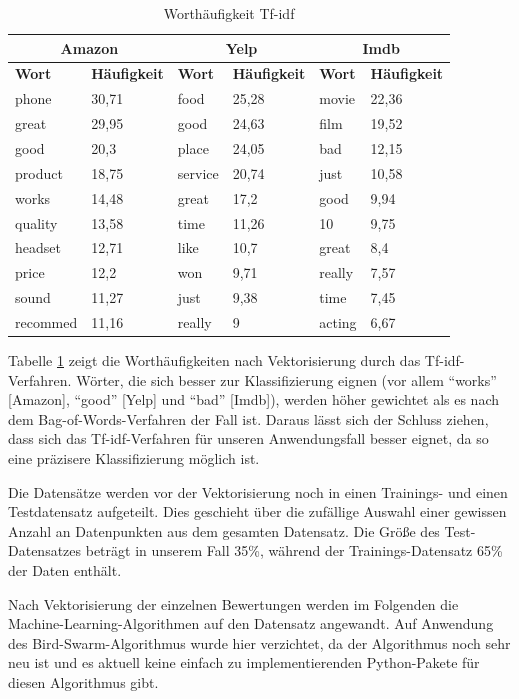 \documentclass[a4paper,12pt]{article}
\begin{document}
\begin{table}[h]
\centering
\begin{tabular}{|ll|ll|ll|}
\hline
\multicolumn{2}{|c|}{\textbf{Amazon}}&\multicolumn{2}{c}{\textbf{Yelp}}&\multicolumn{2}{|c|}{\textbf{Imdb}} \\
\hline
\textbf{Wort} & \textbf{Häufigkeit} & \textbf{Wort} & \textbf{Häufigkeit} &\textbf{Wort} & \textbf{Häufigkeit} \\
\hline
phone & 30,71 & food & 25,28 & movie & 22,36 \\
great & 29,95 & good & 24,63 & film & 19,52 \\
good & 20,3 & place & 24,05 & bad & 12,15 \\
product & 18,75 & service & 20,74 & just & 10,58 \\
works & 14,48 & great & 17,2 & good & 9,94 \\
quality & 13,58 & time & 11,26 & 10 & 9,75 \\
headset & 12,71 & like & 10,7 & great & 8,4 \\
price & 12,2 & won & 9,71 & really & 7,57 \\
sound & 11,27 & just & 9,38 & time & 7,45 \\
recommed & 11,16 & really & 9 & acting & 6,67 \\
\hline
\end{tabular}
\caption{Worthäufigkeit Tf-idf}
\label{Tfidf}
\end{table}

Tabelle \ref{Tfidf} zeigt die Worthäufigkeiten nach Vektorisierung durch das Tf-idf-Verfahren. Wörter, die sich besser zur Klassifizierung eignen (vor allem ``works'' [Amazon], ``good'' [Yelp] und ``bad'' [Imdb]), werden höher gewichtet als es nach dem Bag-of-Words-Verfahren der Fall ist. Daraus lässt sich der Schluss ziehen, dass sich das Tf-idf-Verfahren für unseren Anwendungsfall besser eignet, da so eine präzisere Klassifizierung möglich ist.

Die Datensätze werden vor der Vektorisierung noch in einen Trainings- und einen Testdatensatz aufgeteilt. Dies geschieht über die zufällige Auswahl einer gewissen Anzahl an Datenpunkten aus dem gesamten Datensatz. Die Größe des Test-Datensatzes beträgt in unserem Fall 35\%, während der Trainings-Datensatz 65\% der Daten enthält.

Nach Vektorisierung der einzelnen Bewertungen werden im Folgenden die Machine-Learning-Algorithmen auf den Datensatz angewandt. Auf Anwendung des Bird-Swarm-Algorithmus wurde hier verzichtet, da der Algorithmus noch sehr neu ist und es aktuell keine einfach zu implementierenden Python-Pakete für diesen Algorithmus gibt.
\end{document}
